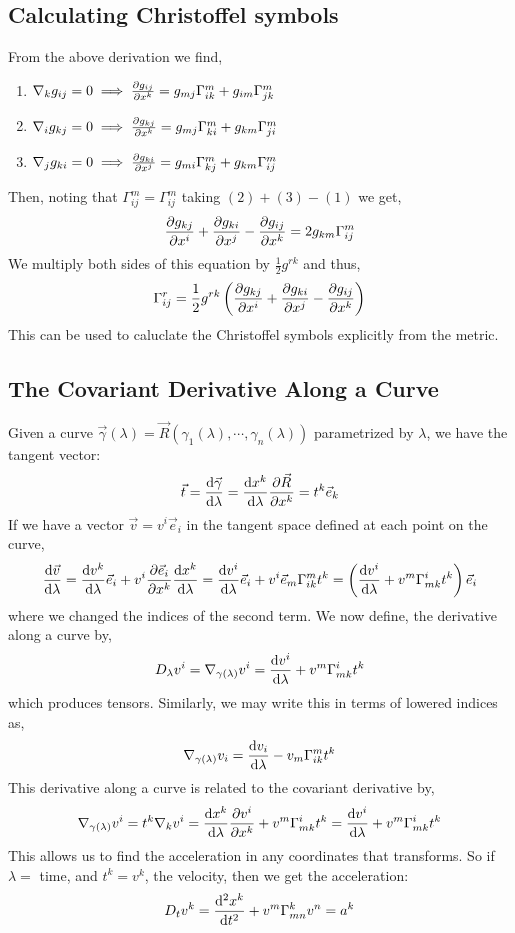 \documentclass[11pt, a4paper]{article}
\begin{document}
\subsection{Calculating Christoffel symbols}
From the above derivation we find, 
\begin{enumerate}
    \item $\nabla_kg_{ij} = 0 \implies \frac{\partial{g_{ij}}}{\partial{x^k}} = g_{mj}\Gamma^m_{ik} + g_{im}\Gamma^m_{jk}$
    \item $\nabla_ig_{kj} = 0 \implies \frac{\partial{g_{kj}}}{\partial{x^k}} = g_{mj}\Gamma^m_{ki} + g_{km}\Gamma^m_{ji}$
    \item $\nabla_jg_{ki} = 0 \implies \frac{\partial{g_{ki}}}{\partial{x^j}} = g_{mi}\Gamma^m_{kj} + g_{km}\Gamma^m_{ij}$
\end{enumerate}
Then, noting that $\Gamma^m_{ij} = \Gamma^m_{ij}$ taking  $(2)+(3)-(1)$ we get,
\[\frac{\partial{g_{kj}}}{\partial{x^i}} + \frac{\partial{g_{ki}}}{\partial{x^j}} - \frac{\partial{g_{ij}}}{\partial{x^k}} = 2g_{km}\Gamma^m_{ij}\]
We multiply both sides of this equation by $\frac{1}{2}g^{rk}$ and thus, 
\[\Gamma^r_{ij}  = \frac{1}{2}g^{rk}\left(\frac{\partial{g_{kj}}}{\partial{x^i}} + \frac{\partial{g_{ki}}}{\partial{x^j}} - \frac{\partial{g_{ij}}}{\partial{x^k}}\right)\]
This can be used to caluclate the Christoffel symbols explicitly from the metric.

\subsection{The Covariant Derivative Along a Curve}

Given a curve $\vec{\gamma}(\lambda) = \vec{R}(\gamma_1(\lambda), \cdots, \gamma_n(\lambda))$ parametrized by $\lambda$, we have the tangent vector: 
\[\vec{t} = \frac{\mathrm{d}\vec{\gamma}}{\mathrm{d}\lambda} = \frac{\mathrm{d}x^k}{\mathrm{d}\lambda} \frac{\partial{\vec{R}}}{\partial{x^k}} = t^k\vec{e}_k\]
If we have a vector $\vec{v} = v^i\vec{e}_i$ in the tangent space defined at each point on the curve,
\begin{align*}
\frac{\mathrm{d}\vec{v}}{\mathrm{d}\lambda} = \frac{\mathrm{d}v^k}{\mathrm{d}\lambda}\vec{e}_i + v^i \frac{\partial{\vec{e}_i}}{\partial{x^k}} \frac{\mathrm{d}x^k}{\mathrm{d}\lambda} = \frac{\mathrm{d}v^i}{\mathrm{d}\lambda} \vec{e}_i + v^i\vec{e}_m\Gamma^m_{ik}t^k = \left(\frac{\mathrm{d}v^i}{\mathrm{d}\lambda} + v^m\Gamma^i_{mk}t^k \right) \vec{e}_i
\end{align*}
where we changed the indices of the second term.  We now define, the derivative along a curve by, 
\[D_\lambda v^i = \nabla_{\gamma(\lambda)} v^i = \frac{\mathrm{d}v^i}{\mathrm{d}\lambda} + v^m\Gamma^i_{mk}t^k\]
which produces tensors.  Similarly, we may write this in terms of lowered indices as, 
\[\nabla_{\gamma(\lambda)} v_i = \frac{\mathrm{d}v_i}{\mathrm{d}\lambda} - v_m\Gamma^m_{ik}t^k\]
This derivative along a curve is related to the covariant derivative by, 
\[\nabla_{\gamma(\lambda)}v^i = t^k \nabla_k v^i = \frac{\mathrm{d}x^k}{\mathrm{d}\lambda} \frac{\partial{v^i}}{\partial{x^k}} + v^m\Gamma^i_{mk}t^k = \frac{\mathrm{d}v^i}{\mathrm{d}\lambda} + v^m\Gamma^i_{mk}t^k\]
This allows us to find the acceleration in any coordinates that transforms.  So if $\lambda = $ time, and $t^k = v^k$, the velocity, then we get the acceleration: 
\[ D_t v^k = \frac{\mathrm{d}^{2} x^k}{\mathrm{d}t^{2}} + v^m\Gamma^k_{mn} v^n = a^k\]
\end{document}
